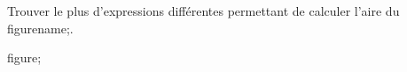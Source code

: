 \documentclass[exercice]{thedocument}%
\begin{document}
%
\begin{flushleft}
    Trouver le plus d'expressions différentes permettant de calculer l'aire
    du \<figurename;.
\end{flushleft}
\begin{center}
    \<figure;
\end{center}
\end{document}
